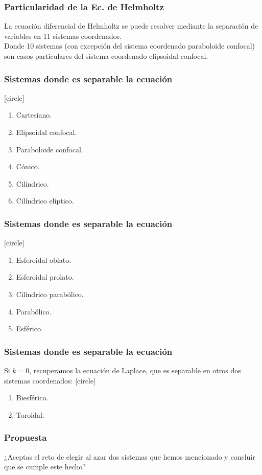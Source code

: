\documentclass[12pt]{beamer}
\begin{document}
\begin{frame}
\frametitle{Particularidad de la Ec. de Helmholtz}
La ecuación diferencial de Helmholtz se puede resolver mediante la separación de variables en 11 sistemas coordenados.
\\
\bigskip
\pause
Donde 10 sistemas (con excepción del sistema coordenado paraboloide confocal) son casos particulares del sistema coordenado elipsoidal confocal.
\end{frame}
\begin{frame}
\frametitle{Sistemas donde es separable la ecuación}
[circle]
\begin{enumerate}[<+->]
\item Cartesiano.
\item Elipsoidal confocal.
\item Paraboloide confocal.
\item Cónico.
\item Cilíndrico.
\item Cilíndrico elíptico.
\seti
\end{enumerate}
\end{frame}
\begin{frame}
\frametitle{Sistemas donde es separable la ecuación}
[circle]
\begin{enumerate}[<+->]
\conti    
\item Esferoidal oblato.
\item Esferoidal prolato.
\item Cilíndrico parabólico.
\item Parabólico.
\item Esférico.
\end{enumerate}
\end{frame}
\begin{frame}
\frametitle{Sistemas donde es separable la ecuación}
Si $k = 0$, recuperamos la ecuación de Laplace, que es separable en otros dos sistemas coordenados:
[circle]
\begin{enumerate}[<+->]
\item Biesférico.
\item Toroidal.
\end{enumerate}
\end{frame}
\begin{frame}
\frametitle{Propuesta}
¿Aceptas el reto de elegir al azar dos sistemas que hemos mencionado y concluir que se cumple este hecho?
\end{frame}
\end{document}
